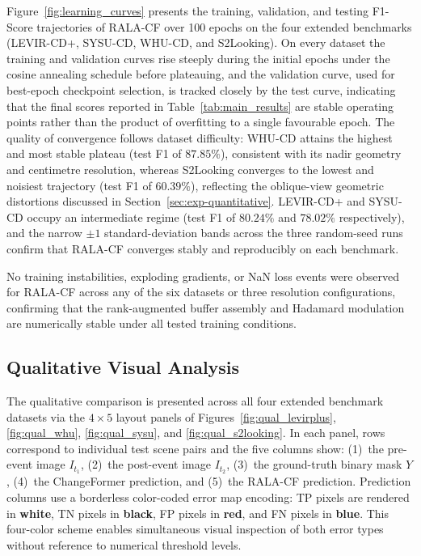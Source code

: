 Figure~\ref{fig:learning_curves} presents the training, validation, and testing F1-Score trajectories of \ac{RALA-CF} over 100 epochs on the four extended benchmarks (LEVIR-CD+, SYSU-CD, WHU-CD, and S2Looking). On every dataset the training and validation curves rise steeply during the initial epochs under the cosine annealing schedule before plateauing, and the validation curve, used for best-epoch checkpoint selection, is tracked closely by the test curve, indicating that the final scores reported in Table~\ref{tab:main_results} are stable operating points rather than the product of overfitting to a single favourable epoch. The quality of convergence follows dataset difficulty: WHU-CD attains the highest and most stable plateau (test F1 of $87.85\%$), consistent with its nadir geometry and centimetre resolution, whereas S2Looking converges to the lowest and noisiest trajectory (test F1 of $60.39\%$), reflecting the oblique-view geometric distortions discussed in Section~\ref{sec:exp-quantitative}. LEVIR-CD+ and SYSU-CD occupy an intermediate regime (test F1 of $80.24\%$ and $78.02\%$ respectively), and the narrow $\pm 1$ standard-deviation bands across the three random-seed runs confirm that \ac{RALA-CF} converges stably and reproducibly on each benchmark.

No training instabilities, exploding gradients, or NaN loss events were observed for \ac{RALA-CF} across any of the six datasets or three resolution configurations, confirming that the rank-augmented buffer assembly and Hadamard modulation are numerically stable under all tested training conditions.

\subsection{Qualitative Visual Analysis}

The qualitative comparison is presented across all four extended benchmark datasets via the $4 \times 5$ layout panels of Figures~\ref{fig:qual_levirplus}, \ref{fig:qual_whu}, \ref{fig:qual_sysu}, and \ref{fig:qual_s2looking}. In each panel, rows correspond to individual test scene pairs and the five columns show: (1)~the pre-event image $I_{t_1}$, (2)~the post-event image $I_{t_2}$, (3)~the ground-truth binary mask $Y$, (4)~the ChangeFormer prediction, and (5)~the \ac{RALA-CF} prediction. Prediction columns use a borderless color-coded error map encoding: \ac{TP} pixels are rendered in \textbf{white}, \ac{TN} pixels in \textbf{black}, \ac{FP} pixels in \textbf{red}, and \ac{FN} pixels in \textbf{blue}. This four-color scheme enables simultaneous visual inspection of both error types without reference to numerical threshold levels.

